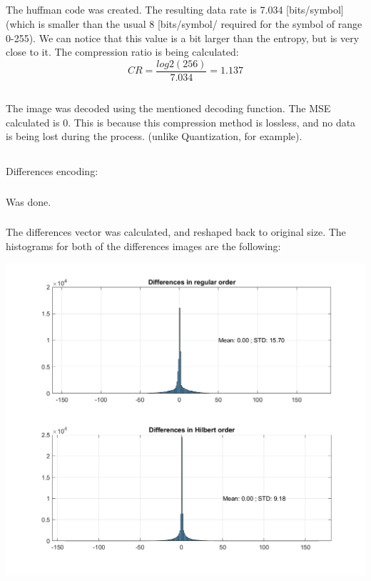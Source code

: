 \documentclass[a4paper]{iacas}
\begin{document}
\subsection{}
The huffman code was created. The resulting data rate is 7.034 [bits/symbol] (which is smaller than the usual 8 [bits/symbol/ required for the symbol of range 0-255). We can notice that this value is a bit larger than the entropy, but is very close to it. The compression ratio is being calculated: $$CR = \frac{log2(256)}{7.034} = 1.137$$

\subsection{}
The image was decoded using the mentioned decoding function. The MSE calculated is 0. This is because this compression method is lossless, and no data is being lost during the process. (unlike Quantization, for example).

\subsection{}
Differences encoding:
\subsubsection{}
Was done.
\subsubsection{}
The differences vector was calculated, and reshaped back to original size. The histograms for both of the differences images are the following:
\vskip 0.1in
\begin{minipage}{1\textwidth}
\centering
	\includegraphics[scale=0.9]{../imgs/imgs_q3/q3_histograms_comp.png}
\end{minipage}
\vskip 0.1in
\end{document}
